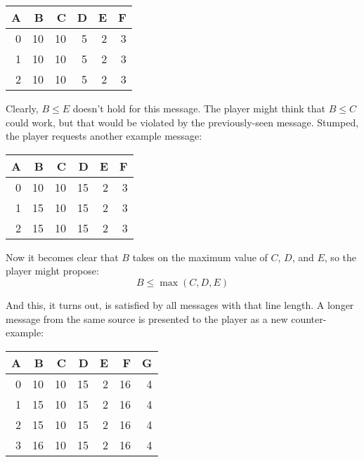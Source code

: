 \documentclass[12pt]{article}
\begin{document}
\begin{center}

\begin{tabular}{|r|r|r|r|r|r|}

{\bf A}&\bf B&\bf C&\bf D&\bf E&\bf F\\

\hline
\hline
0&10&10&5&2&3\\
\hline
\hline
1&10&10&5&2&3\\
\hline
\hline
2&10&10&5&2&3\\
\hline
\end{tabular}

\end{center}

Clearly, $B \leq E$ doesn't hold for this message.  The player might think that $B \leq C$ could work, but that would be violated by the previously-seen message.  Stumped, the player requests another example message:

\begin{center}

\begin{tabular}{|r|r|r|r|r|r|}

{\bf A}&\bf B&\bf C&\bf D&\bf E&\bf F\\

\hline
\hline
0&10&10&15&2&3\\
\hline
\hline
1&15&10&15&2&3\\
\hline
\hline
2&15&10&15&2&3\\
\hline
\end{tabular}

\end{center}

Now it becomes clear that $B$ takes on the maximum value of $C$, $D$, and $E$, so the player might propose:
\[
B \leq \max( C, D, E )
\]

And this, it turns out, is satisfied by all messages with that line length.  A longer message from the same source is presented to the player as a new counter-example:

\begin{center}

\begin{tabular}{|r|r|r|r|r|r|r|}

{\bf A}&\bf B&\bf C&\bf D&\bf E&\bf F &\bf G\\

\hline
\hline
0&10&10&15&2&16&4\\
\hline
\hline
1&15&10&15&2&16&4\\
\hline
\hline
2&15&10&15&2&16&4\\
\hline
\hline
3&16&10&15&2&16&4\\
\hline
\end{tabular}

\end{center}
\end{document}
